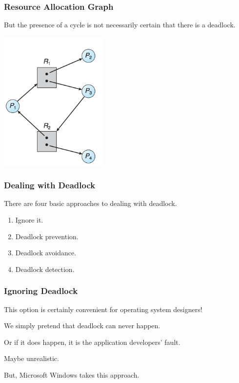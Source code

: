 \begin{frame}
\frametitle{Resource Allocation Graph}

But the presence of a cycle is not necessarily certain that there is a deadlock.

\begin{center}
\includegraphics[width=0.40\textwidth]{images/rag3.png}
\end{center}


\end{frame}

\begin{frame}
\frametitle{Dealing with Deadlock}

There are four basic approaches to dealing with deadlock.

\begin{enumerate}
	\item Ignore it.
	\item Deadlock prevention.
	\item Deadlock avoidance.
	\item Deadlock detection.
\end{enumerate}

\end{frame}

\begin{frame}
\frametitle{Ignoring Deadlock}

This option is certainly convenient for operating system designers!

We simply pretend that deadlock can never happen. 

Or if it does happen, it is the application developers' fault. 

Maybe unrealistic.

But, Microsoft Windows takes this approach.

\end{frame}

